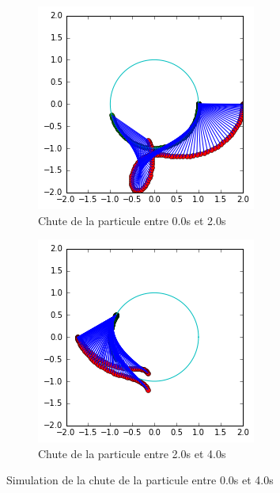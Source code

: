 \documentclass[10pt]{article}
\begin{document}
\begin{figure}[h]
 \centering
 \begin{subfigure}{0.4\textwidth}
  \includegraphics[width=\textwidth]{fig.png}
  \caption{Chute de la particule entre 0.0s et 2.0s}
 \end{subfigure}
 \begin{subfigure}{0.4\textwidth}
  \includegraphics[width=\textwidth]{fig2.png}
  \caption{Chute de la particule entre 2.0s et 4.0s}
 \end{subfigure}
\caption{Simulation de la chute de la particule entre 0.0s et 4.0s}
\end{figure}
\end{document}
